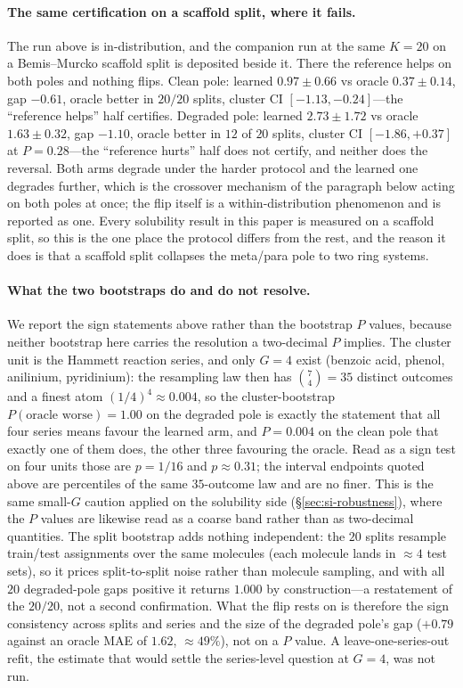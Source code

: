 \paragraph{The same certification on a scaffold split, where it fails.} The run above is
in-distribution, and the companion run at the same $K{=}20$ on a Bemis--Murcko scaffold split is
deposited beside it. There the reference helps on both poles and nothing flips. Clean pole: learned
$0.97\pm0.66$ vs oracle $0.37\pm0.14$, gap $-0.61$, oracle better in $20/20$ splits, cluster CI
$[-1.13,-0.24]$---the ``reference helps'' half certifies. Degraded pole: learned $2.73\pm1.72$ vs
oracle $1.63\pm0.32$, gap $-1.10$, oracle better in $12$ of $20$ splits, cluster CI
$[-1.86,+0.37]$ at $P=0.28$---the ``reference hurts'' half does not certify, and neither does the
reversal. Both arms degrade under the harder protocol and the learned one degrades further, which is
the crossover mechanism of the paragraph below acting on both poles at once; the flip itself is a
within-distribution phenomenon and is reported as one. Every solubility result in this paper is
measured on a scaffold split, so this is the one place the protocol differs from the rest, and the
reason it does is that a scaffold split collapses the meta/para pole to two ring systems.

\paragraph{What the two bootstraps do and do not resolve.} We report the sign statements above rather
than the bootstrap $P$ values, because neither bootstrap here carries the resolution a two-decimal $P$
implies. The cluster unit is the Hammett reaction series, and only $G{=}4$ exist (benzoic acid,
phenol, anilinium, pyridinium): the resampling law then has $\binom{7}{4}{=}35$ distinct outcomes and
a finest atom $(1/4)^4{\approx}0.004$, so the cluster-bootstrap $P(\text{oracle worse}){=}1.00$ on
the degraded pole is exactly the statement that all four series means favour the learned arm, and $P{=}0.004$ on
the clean pole that exactly one of them does, the other three favouring the oracle. Read as a sign test on
four units those are $p{=}1/16$ and $p{\approx}0.31$; the interval endpoints quoted above are
percentiles of the same $35$-outcome law and are no finer. This is the same small-$G$ caution applied
on the solubility side (\S\ref{sec:si-robustness}), where the $P$ values are likewise read as a coarse
band rather than as two-decimal quantities. The split bootstrap adds nothing independent: the $20$
splits resample train/test assignments over the same molecules (each molecule lands in ${\approx}4$
test sets), so it prices split-to-split noise rather than molecule sampling, and with all $20$ degraded-pole
gaps positive it returns $1.000$ by construction---a restatement of the $20/20$, not a second
confirmation. What the flip rests on is therefore the sign consistency across splits and series and
the size of the degraded pole's gap ($+0.79$ against an oracle MAE of $1.62$, ${\approx}49\%$), not on a $P$
value. A leave-one-series-out refit, the estimate that would settle the series-level question at
$G{=}4$, was not run.

